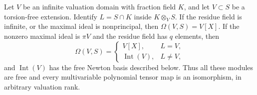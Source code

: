 \begin{corollary}\label{cor:valuation-free-newton-basis}
Let $V$ be an infinite valuation domain with fraction field $K$,
and let $V\subset S$ be a torsion-free extension. Identify
$L=S\cap K$ inside $K\otimes_VS$. If the residue field is infinite,
or the maximal ideal is nonprincipal, then $\Omega(V,S)=V[X]$.
If the nonzero maximal ideal is $\pi V$ and the residue field has
$q$ elements, then
\[
 \Omega(V,S)=
 \begin{cases}
 V[X],&L=V,\\
 \operatorname{Int}(V),&L\ne V,
 \end{cases}
\]
and $\operatorname{Int}(V)$ has the free Newton basis described
below. Thus all these modules are free and every multivariable
polynomial tensor map is an isomorphism, in arbitrary valuation
rank.
\end{corollary}
